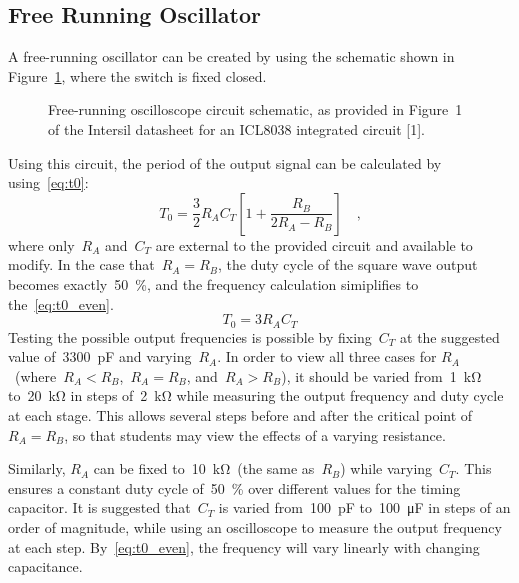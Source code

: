 \subsection{Free Running Oscillator}
A free-running oscillator can be created by using the schematic shown in
Figure~\ref{fig:free_run}, where the switch is fixed closed.
%
\begin{figure}[H]
	\centering
	
	\parbox{.6\textwidth}{
	\caption{Free-running oscilloscope circuit schematic, as provided in Figure~1 of the
	Intersil datasheet for an ICL8038 integrated circuit [1].}
	\label{fig:free_run}}
\end{figure}
%
Using this circuit, the period of the output signal can be calculated by using~\eqref{eq:t0}:
%
\begin{equation}
	T_0 = \frac{3}{2} R_A C_T \left[ 1 + \frac{R_B}{2R_A - R_B} \right] \quad \text{,}
	\label{eq:t0}
\end{equation}
%
where only~$R_A$ and~$C_T$ are external to the provided circuit and available
to modify.  In the case that~$R_A = R_B$, the duty cycle of the square wave
output becomes exactly~\SI{50}{\percent}, and the frequency calculation
simiplifies to the~\eqref{eq:t0_even}.
%
\begin{equation}
	T_0 = 3 R_A C_T
	\label{eq:t0_even}
\end{equation}
%
Testing the possible output frequencies is possible by fixing~$C_T$ at the
suggested value of~\SI{3300}{\pico\farad} and varying~$R_A$.  In order to view
all three cases for $R_A$~(where~$R_A < R_B$,~$R_A = R_B$, and~$R_A > R_B$), it
should be varied from~\SI{1}{\kilo\ohm} to~\SI{20}{\kilo\ohm} in steps
of~\SI{2}{\kilo\ohm} while measuring the output frequency and duty cycle at
each stage.  This allows several steps before and after the critical point
of~$R_A = R_B$, so that students may view the effects of a varying resistance.

Similarly, $R_A$ can be fixed to~\SI{10}{\kilo\ohm}~(the same as~$R_B$) while
varying~$C_T$.  This ensures a constant duty cycle of~\SI{50}{\percent} over
different values for the timing capacitor.  It is suggested that~$C_T$ is
varied from~\SI{100}{\pico\farad} to~\SI{100}{\micro\farad} in steps of an
order of magnitude, while using an oscilloscope to measure the output frequency
at each step.  By~\eqref{eq:t0_even}, the frequency will vary linearly with
changing capacitance.

